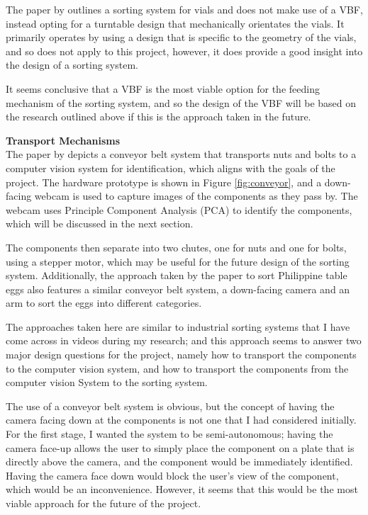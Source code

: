 The paper by \citet{zhang2019design} outlines a sorting system for vials and does not make use of a VBF, instead opting for a turntable design that mechanically orientates the vials. It primarily operates
by using a design that is specific to the geometry of the vials, and so does not apply to this project, however, it does provide a good insight into the design of a sorting system.

It seems conclusive that a VBF is the most viable option for the feeding mechanism of the sorting system, and so the design of the VBF will be based on the research outlined above if this is the approach taken in the future.

\noindent
\textbf{Transport Mechanisms} \\
The paper by \citet{Dhenge2013MechanicalNS} depicts a conveyor belt system that transports nuts and bolts to a computer vision system for identification, which aligns with the goals of the project. 
The hardware prototype is shown in Figure \ref*{fig:conveyor}, and a down-facing webcam is used to capture images of the components as they pass by. The webcam uses Principle Component Analysis (PCA) to identify the components,
which will be discussed in the next section.

The components then separate into two chutes, one for nuts and one for bolts, using a stepper motor, which may be useful for the future design of the sorting system.
Additionally, the approach taken by the paper \citet{eggsorting} to sort Philippine table eggs also features a similar conveyor belt system, a down-facing camera and an arm to sort the eggs into different categories. 

The approaches taken here are similar to industrial sorting systems that I have come across in videos during my research; and this approach seems to answer two major design questions for the project, namely
how to transport the components to the computer vision system, and how to transport the components from the computer vision System to the sorting system.

The use of a conveyor belt system is obvious, but the concept of having the camera facing down at the components is not one that I had considered initially. For the first stage, I wanted the system to be semi-autonomous;
having the camera face-up allows the user to simply place the component on a plate that is directly above the camera, and the component would be immediately identified. Having the camera face down
would block the user's view of the component, which would be an inconvenience. However, it seems that this would be the most viable approach for the future of the project.

